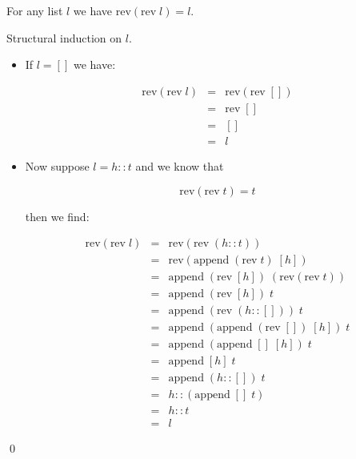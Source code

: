 \begin{theorem}

For any list $l$ we have $\mbox{rev}(\mbox{rev}\; l) = l$.

\proof Structural induction on $l$.

\begin{itemize}

\item If $l = []$ we have:

\begin{eqnarray*}
\mbox{rev}(\mbox{rev}\; l)
& = & \mbox{rev}(\mbox{rev}\; [])                               \\
& = & \mbox{rev}\; []                                               \\
& = & []                                                                \\
& = & l
\end{eqnarray*}

\item Now suppose $l = h::t$ and we know that

$$ \mbox{rev}(\mbox{rev}\; t) = t $$

\noindent then we find:

\begin{eqnarray*}
\mbox{rev}(\mbox{rev}\; l)
& = & \mbox{rev}(\mbox{rev}\; (h::t))                           \\
& = & \mbox{rev}(\mbox{append}\; (\mbox{rev}\; t)\; [h])        \\
& = & \mbox{append}\; (\mbox{rev}\; [h])\; (\mbox{rev} (\mbox{rev}\; t))             \\
& = & \mbox{append}\; (\mbox{rev}\; [h])\; t                        \\
& = & \mbox{append}\; (\mbox{rev}\; (h::[]))\; t                    \\
& = & \mbox{append}\; (\mbox{append}\; (\mbox{rev}\; [])\; [h])\; t     \\
& = & \mbox{append}\; (\mbox{append}\; []\; [h])\; t                    \\
& = & \mbox{append}\; [h]\; t                                           \\
& = & \mbox{append}\; (h::[])\; t                                       \\
& = & h::(\mbox{append}\; []\; t)                                       \\
& = & h::t                                                              \\
& = & l
\end{eqnarray*}

\end{itemize}

\qed

\end{theorem}

